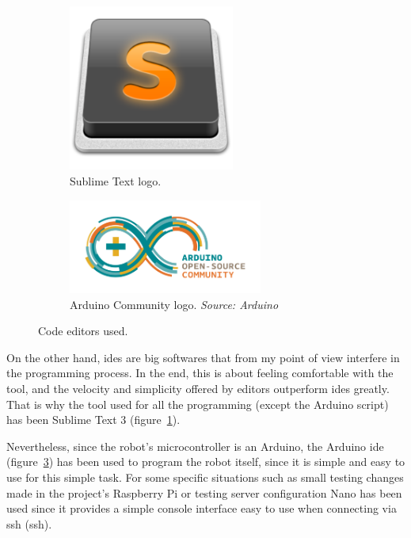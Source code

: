 \begin{figure}[!htbp]
	\centering
	\begin{subfigure}{0.35\textwidth}
		\centering
		\includegraphics[width=0.6\textwidth]{fig/sublime}
		\caption{Sublime Text logo.}\label{subfig:sublime}
	\end{subfigure}\quad
	\begin{subfigure}{0.55\textwidth}
		\centering
		\includegraphics[width=0.7\textwidth]{fig/arduino-community}
		\caption{Arduino Community logo. \emph{Source: Arduino}}\label{subfig:arduino_community}
	\end{subfigure}\quad
	\caption{Code editors used.}
\end{figure}

On the other hand, \acrshort{ide}s are big softwares that from my point of view interfere in the
programming process. In the end, this is about feeling comfortable with the tool, and the velocity
and simplicity offered by editors outperform \acrshort{ide}s greatly. That is why the tool used for
all the programming (except the Arduino script) has been Sublime Text 3
(figure~\ref{subfig:sublime}).

Nevertheless, since the robot's microcontroller is an Arduino, the Arduino
\acrshort{ide}~\cite{arduino_ide} (figure~\ref{subfig:arduino_community}) has been used to program
the robot itself, since it is simple and easy to use for this simple task. For some specific
situations such as small testing changes made in the project's Raspberry Pi or testing server
configuration Nano has been used since it provides a simple console interface easy to use when
connecting via \acrshort{ssh} (\acrlong{ssh}).

